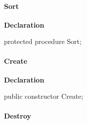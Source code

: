 \documentclass{report}
\newif\ifpdf
\begin{document}
\paragraph*{Sort}\hspace*{\fill}

\label{PasDoc_HierarchyTree.TPasItemNode-Sort}
\begin{list}{}{
\setlength{\itemindent}{0cm}
\setlength{\listparindent}{0cm}
\setlength{\leftmargin}{\evensidemargin}
\addtolength{\leftmargin}{\tmplength}
\settowidth{\labelsep}{X}
\addtolength{\leftmargin}{\labelsep}
\setlength{\labelwidth}{\tmplength}
}
\item[\textbf{Declaration}\hfill]
\ifpdf
\begin{flushleft}
\fi
\begin{ttfamily}
protected procedure Sort;\end{ttfamily}

\ifpdf
\end{flushleft}
\fi

\end{list}
\paragraph*{Create}\hspace*{\fill}

\label{PasDoc_HierarchyTree.TPasItemNode-Create}
\begin{list}{}{
\setlength{\itemindent}{0cm}
\setlength{\listparindent}{0cm}
\setlength{\leftmargin}{\evensidemargin}
\addtolength{\leftmargin}{\tmplength}
\settowidth{\labelsep}{X}
\addtolength{\leftmargin}{\labelsep}
\setlength{\labelwidth}{\tmplength}
}
\item[\textbf{Declaration}\hfill]
\ifpdf
\begin{flushleft}
\fi
\begin{ttfamily}
public constructor Create;\end{ttfamily}

\ifpdf
\end{flushleft}
\fi

\end{list}
\paragraph*{Destroy}\hspace*{\fill}
\end{document}
